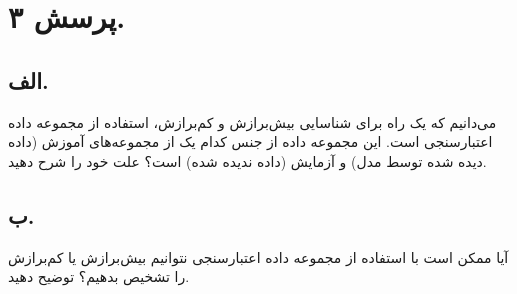\section{پرسش ۳.}

\subsection*{الف.}
می‌دانیم که یک راه برای شناسایی بیش‌برازش و کم‌برازش، استفاده از مجموعه داده اعتبارسنجی است. این مجموعه داده از جنس کدام یک از مجموعه‌های آموزش (داده دیده شده توسط مدل) و آزمایش (داده ندیده شده) است؟ علت خود را شرح دهید.

\subsection*{ب.}
آیا ممکن است با استفاده از مجموعه داده اعتبارسنجی نتوانیم بیش‌برازش یا کم‌برازش را تشخیص بدهیم؟ توضیح دهید.
